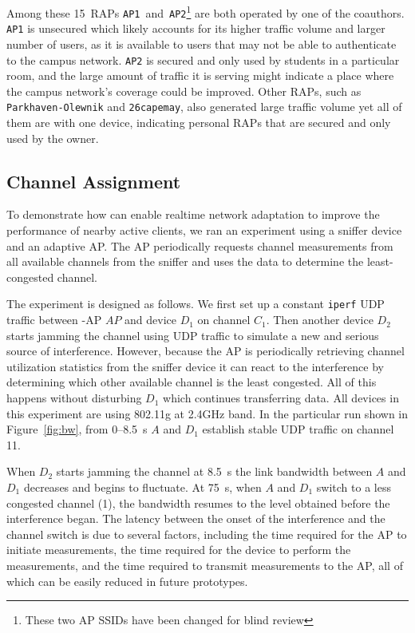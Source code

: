 Among these 15~RAPs \texttt{AP1}~and~\texttt{AP2}\footnote{These two AP SSIDs
have been changed for blind review} are both operated by one of the
coauthors. \texttt{AP1} is unsecured which likely accounts for its higher
traffic volume and larger number of users, as it is available to users that
may not be able to authenticate to the campus network. \texttt{AP2} is
secured and only used by students in a particular room, and the large amount
of traffic it is serving might indicate a place where the campus network's
coverage could be improved. Other RAPs, such as \texttt{Parkhaven-Olewnik}
and \texttt{26capemay}, also generated large traffic volume yet all of them
are with one device, indicating personal RAPs that are secured and only used
by the owner.

\subsection{Channel Assignment}
\label{subsec-channel}

To demonstrate how \PS{} can enable realtime network adaptation to improve
the performance of nearby active clients, we ran an experiment using a
sniffer device and an adaptive AP. The AP periodically requests channel
measurements from all available channels from the sniffer and uses the data
to determine the least-congested channel.

The experiment is designed as follows. We first set up a constant
\texttt{iperf} UDP traffic between \PS{}-AP $AP$ and device $D_1$ on channel
$C_1$. Then another device $D_2$ starts jamming the channel using UDP traffic
to simulate a new and serious source of interference. However, because the AP
is periodically retrieving channel utilization statistics from the sniffer
device it can react to the interference by determining which other available
channel is the least congested. All of this happens without disturbing $D_1$
which continues transferring data. All devices in this experiment are using
802.11g at 2.4GHz band. In the particular run shown in Figure~\ref{fig:bw},
from 0--8.5~s $A$ and $D_1$ establish stable UDP traffic on channel 11.

When $D_2$ starts jamming the channel at 8.5~s the link bandwidth between $A$
and $D_1$ decreases and begins to fluctuate. At 75~s, when $A$ and $D_1$
switch to a less congested channel (1), the bandwidth resumes to the level
obtained before the interference began. The latency between the onset of the
interference and the channel switch is due to several factors, including the
time required for the AP to initiate measurements, the time required for the
device to perform the measurements, and the time required to transmit measurements to
the AP, all of which can be easily reduced in future prototypes.

